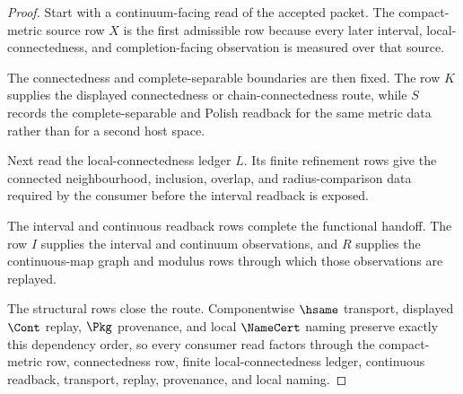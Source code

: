 \begin{proof}
Start with a continuum-facing read of the accepted packet. The compact-metric source row $X$ is the first admissible row because every later interval, local-connectedness, and completion-facing observation is measured over that source.

The connectedness and complete-separable boundaries are then fixed. The row $K$ supplies the displayed connectedness or chain-connectedness route, while $S$ records the complete-separable and Polish readback for the same metric data rather than for a second host space.

Next read the local-connectedness ledger $L$. Its finite refinement rows give the connected neighbourhood, inclusion, overlap, and radius-comparison data required by the consumer before the interval readback is exposed.

The interval and continuous readback rows complete the functional handoff. The row $I$ supplies the interval and continuum observations, and $R$ supplies the continuous-map graph and modulus rows through which those observations are replayed.

The structural rows close the route. Componentwise $\hsame$ transport, displayed $\Cont$ replay, $\Pkg$ provenance, and local $\NameCert$ naming preserve exactly this dependency order, so every consumer read factors through the compact-metric row, connectedness row, finite local-connectedness ledger, continuous readback, transport, replay, provenance, and local naming.
\end{proof}


\begin{closurestatus}{\PeanoContinuumUp}
  \theoryclosure{\seedClosure}
  \formalstatus{\unformalizedV}
\end{closurestatus}
